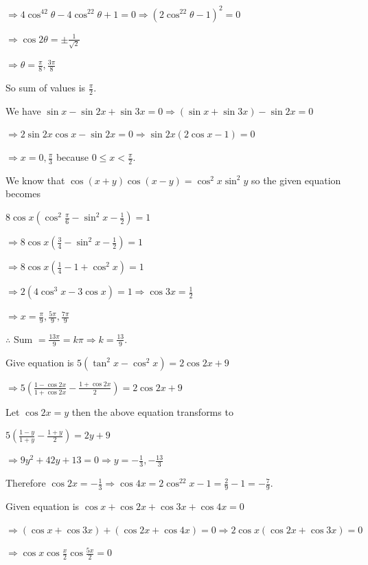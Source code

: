   $\Rightarrow 4\cos^42\theta - 4\cos^22\theta + 1 = 0 \Rightarrow \left(2\cos^22\theta - 1\right)^2 = 0$

  $\Rightarrow \cos2\theta = \pm\frac{1}{\sqrt{2}}$

  $\Rightarrow \theta = \frac{\pi}{8}, \frac{3\pi}{8}$

  So sum of values is $\frac{\pi}{2}$.
\item We have $\sin x - \sin2x + \sin3x = 0\Rightarrow (\sin x + \sin3x) - \sin2x = 0$

  $\Rightarrow 2\sin2x\cos x - \sin2x = 0 \Rightarrow \sin2x(2\cos x - 1) = 0$

  $\Rightarrow x = 0, \frac{\pi}{3}$ because $0 \le x < \frac{\pi}{2}$.
\item We know that $\cos(x + y)\cos(x - y) = \cos^2x\sin^2y$ so the given equation becomes

  $8\cos x\left(\cos^2\frac{\pi}{6} - \sin^2x - \frac{1}{2}\right) = 1$

  $\Rightarrow 8\cos x\left(\frac{3}{4} - \sin^2x - \frac{1}{2}\right) = 1$

  $\Rightarrow 8\cos x\left(\frac{1}{4} - 1 + \cos^2x\right) = 1$

  $\Rightarrow 2(4\cos^3x - 3\cos x) = 1\Rightarrow \cos3x = \frac{1}{2}$

  $\Rightarrow x = \frac{\pi}{9}, \frac{5\pi}{9}, \frac{7\pi}{9}$

  $\therefore $ Sum $= \frac{13\pi}{9} = k\pi \Rightarrow k = \frac{13}{9}$.
\item Give equation is $5\left(\tan^2x - \cos^2x\right) = 2\cos2x + 9$

  $\Rightarrow 5\left(\frac{1 - \cos2x}{1 + \cos2x} - \frac{1 + \cos2x}{2}\right) = 2\cos2x + 9$

  Let $\cos2x = y$ then the above equation transforms to

  $5\left(\frac{1 - y}{1 + y} - \frac{1 + y}{2}\right) = 2y + 9$

  $\Rightarrow 9y^2 + 42y + 13 = 0 \Rightarrow y = -\frac{1}{3}, -\frac{13}{3}$

  Therefore $\cos2x = -\frac{1}{3} \Rightarrow \cos4x = 2\cos^22x - 1 = \frac{2}{9} - 1 = -\frac{7}{9}$.
\item Given equation is $\cos x + \cos2x + \cos3x + \cos4x = 0$

  $\Rightarrow (\cos x + \cos3x) + (\cos2x + \cos4x) = 0\Rightarrow 2\cos x(\cos2x + \cos3x) = 0$

  $\Rightarrow \cos x\cos\frac{x}{2}\cos\frac{5x}{2} = 0$

